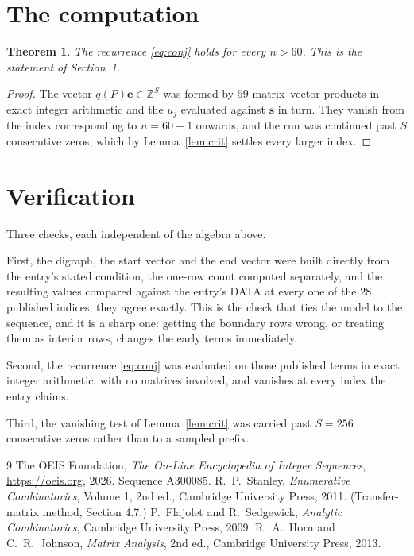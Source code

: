 \documentclass[11pt,a4paper]{article}
\theoremstyle{plain}
\newtheorem{theorem}{Theorem}
\theoremstyle{definition}
\begin{document}
\section{The computation}

\begin{theorem}
The recurrence \eqref{eq:conj} holds for every $n>60$. This is the statement of
Section~1.
\end{theorem}

\begin{proof}
The vector $q(P)\mathbf{e}\in\mathbb{Z}^{S}$ was formed by $59$ matrix--vector
products in exact integer arithmetic and the $u_j$ evaluated against $\mathbf{s}$ in turn.
They vanish from the index corresponding to $n=60+1$ onwards, and the run was continued
past $S$ consecutive zeros, which by Lemma~\ref{lem:crit} settles every larger index.
\end{proof}

\section{Verification}

Three checks, each independent of the algebra above.

First, the digraph, the start vector and the end vector were built directly from the
entry's stated condition, the one-row count computed separately, and the resulting values
compared against the entry's DATA at every one of the $28$ published indices; they
agree exactly. This is the check that ties the model to the sequence, and it is a sharp one:
getting the boundary rows wrong, or treating them as interior rows, changes the early terms
immediately.

Second, the recurrence \eqref{eq:conj} was evaluated on those published terms in exact
integer arithmetic, with no matrices involved, and vanishes at every index the entry claims.

Third, the vanishing test of Lemma~\ref{lem:crit} was carried past $S=256$ consecutive
zeros rather than to a sampled prefix.

\begin{thebibliography}{9}
 The OEIS Foundation, \emph{The On-Line Encyclopedia of Integer
Sequences}, \url{https://oeis.org}, 2026. Sequence A300085.
 R.~P.~Stanley, \emph{Enumerative Combinatorics}, Volume 1, 2nd ed.,
Cambridge University Press, 2011. (Transfer-matrix method, Section 4.7.)
 P.~Flajolet and R.~Sedgewick, \emph{Analytic Combinatorics}, Cambridge
University Press, 2009.
 R.~A.~Horn and C.~R.~Johnson, \emph{Matrix Analysis}, 2nd ed., Cambridge
University Press, 2013.
\end{thebibliography}
\end{document}
